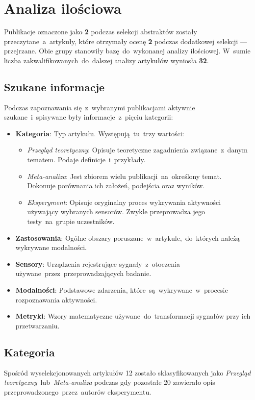 \section{Analiza ilościowa}
Publikacje oznaczone jako {\bf 2} podczas selekcji abstraktów zostały przeczytane~a~artykuły, które otrzymały ocenę {\bf 2} podczas dodatkowej selekcji --- przejrzane. Obie grupy stanowiły bazę~do~wykonanej analizy ilościowej. W~sumie liczba zakwalifikowanych~do~dalszej analizy artykułów wyniosła {\bf 32}.

\subsection{Szukane informacje}
Podczas zapoznawania się~z~wybranymi publikacjami aktywnie szukane~i~spisywane były informacje~z~pięciu kategorii:
\begin{itemize}
    \item {\bf Kategoria}: Typ artykułu. Występują~tu~trzy wartości:
    \begin{itemize}
		\item {\it Przegląd teoretyczny}: Opisuje teoretyczne zagadnienia związane~z~danym tematem. Podaje definicje~i~przykłady.
		\item {\it Meta-analiza}: Jest zbiorem wielu publikacji~na~określony temat. Dokonuje porównania ich założeń, podejścia oraz wyników.
		\item {\it Eksperyment}: Opisuje oryginalny proces wykrywania aktywności używający wybranych sensorów. Zwykle przeprowadza jego testy~na~grupie uczestników.
	\end{itemize}
    \item {\bf Zastosowania}: Ogólne obszary poruszane~w~artykule,~do~których należą wykrywane modalności.
    \item {\bf Sensory}: Urządzenia rejestrujące sygnały~z~otoczenia używane~przez~przeprowadzających badanie.
    \item {\bf Modalności}: Podstawowe zdarzenia, które~są~wykrywane~w~procesie rozpoznawania aktywności.
    \item {\bf Metryki}: Wzory matematyczne używane~do~transformacji sygnałów przy ich przetwarzaniu.
\end{itemize}

\subsection{Kategoria}
Spośród wyselekcjonowanych artykułów 12 zostało sklasyfikowanych jako \textit{Przegląd teoretyczny}~lub~\textit{Meta-analiza} podczas gdy pozostałe 20 zawierało opis przeprowadzonego~przez~autorów eksperymentu. 

